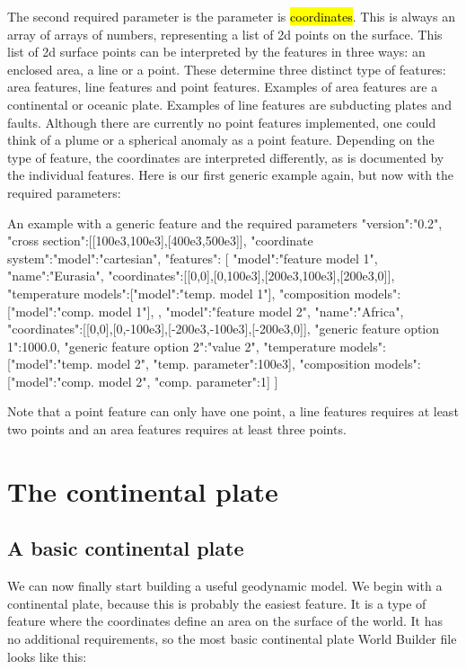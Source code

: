 \documentclass{book}
\newcommand{\WB}{{World Builder}}
\begin{document}
The second required parameter is the parameter is \hl{coordinates}. This is always an array of arrays of numbers, representing a list of 2d points on the surface. This list of 2d surface points can be interpreted by the features in three ways: an enclosed area, a line or a point. These determine three distinct type of features: area features, line features and point features. Examples of area features are a continental or oceanic plate. Examples of line features are subducting plates and faults. Although there are currently no point features implemented, one could think of a plume or a spherical anomaly as a point feature. Depending on the type of feature, the coordinates are interpreted differently, as is documented by the individual features. Here is our first generic example again, but now with the required parameters:

\begin{javascriptcode}{An example with a generic feature and the required parameters}{}
{
  "version":"0.2",
  "cross section":[[100e3,100e3],[400e3,500e3]],
  "coordinate system":{"model":"cartesian"},
  "features":
  [
    {
      "model":"feature model 1",
      "name":"Eurasia",
      "coordinates":[[0,0],[0,100e3],[200e3,100e3],[200e3,0]],
      "temperature models":[{"model":"temp. model 1"}],
      "composition models":[{"model":"comp. model 1"}],
    },
    {
      "model":"feature model 2",
      "name":"Africa",
      "coordinates":[[0,0],[0,-100e3],[-200e3,-100e3],[-200e3,0]],
      "generic feature option 1":1000.0,
      "generic feature option 2":"value 2",
      "temperature models":[{"model":"temp. model 2", "temp. parameter":100e3}],
      "composition models":[{"model":"comp. model 2", "comp. parameter":1}]
    }
  ]
}
\end{javascriptcode}

\begin{remark}
Note that a point feature can only have one point, a line features requires at least two points and an area features requires at least three points.
\end{remark}

\section{The continental plate}
\label{section:continetnal_plate}
\subsection{A basic continental plate}
We can now finally start building a useful geodynamic model. We begin with a continental plate, because this is probably the easiest feature. It is a type of feature where the coordinates define an area on the surface of the world. It has no additional requirements, so the most basic continental plate \WB{} file looks like this:
\end{document}
